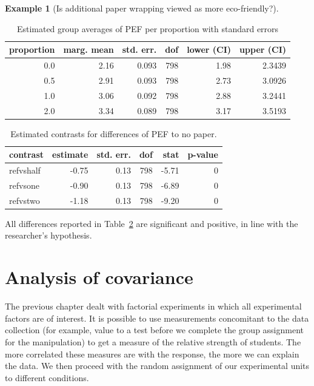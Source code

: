 \documentclass[
  11pt,
  letterpaper,
]{scrbook}
\theoremstyle{definition}
\newtheorem{example}{Example}[chapter]
\theoremstyle{definition}
\theoremstyle{remark}
\begin{document}
\begin{example}[Is additional paper wrapping viewed as more
eco-friendly?]
\begin{longtable}[t]{rrrrrr}
\caption{\label{tbl-print-groupmeans-PEF}Estimated group averages of PEF
per proportion with standard errors}

\tabularnewline

\toprule
proportion & marg. mean & std. err. & dof & lower (CI) & upper (CI)\\
\midrule
0.0 & 2.16 & 0.093 & 798 & 1.98 & 2.3439\\
0.5 & 2.91 & 0.093 & 798 & 2.73 & 3.0926\\
1.0 & 3.06 & 0.092 & 798 & 2.88 & 3.2441\\
2.0 & 3.34 & 0.089 & 798 & 3.17 & 3.5193\\
\bottomrule

\end{longtable}

\begin{longtable}[t]{lrrrrr}

\caption{\label{tbl-print-contrast-PEF}Estimated contrasts for
differences of PEF to no paper.}

\tabularnewline

\toprule
contrast & estimate & std. err. & dof & stat & p-value\\
\midrule
refvshalf & -0.75 & 0.13 & 798 & -5.71 & 0\\
refvsone & -0.90 & 0.13 & 798 & -6.89 & 0\\
refvstwo & -1.18 & 0.13 & 798 & -9.20 & 0\\
\bottomrule

\end{longtable}

All differences reported in Table~\ref{tbl-print-contrast-PEF} are
significant and positive, in line with the researcher's hypothesis.

\end{example}

\section{Analysis of covariance}\label{analysis-of-covariance}

The previous chapter dealt with factorial experiments in which all
experimental factors are of interest. It is possible to use measurements
concomitant to the data collection (for example, value to a test before
we complete the group assignment for the manipulation) to get a measure
of the relative strength of students. The more correlated these measures
are with the response, the more we can explain the data. We then proceed
with the random assignment of our experimental units to different
conditions.
\end{document}
